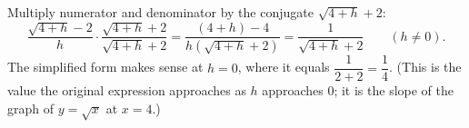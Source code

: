 Multiply numerator and denominator by the conjugate $\sqrt{4+h}+2$:
\[\dfrac{\sqrt{4+h}-2}{h}\cdot\dfrac{\sqrt{4+h}+2}{\sqrt{4+h}+2}=\dfrac{(4+h)-4}{h\left(\sqrt{4+h}+2\right)}=\boxed{\dfrac{1}{\sqrt{4+h}+2}}\qquad(h\ne0).\]
The simplified form makes sense at $h=0$, where it equals $\dfrac{1}{2+2}=\boxed{\dfrac14}$. (This is the value the original expression approaches as $h$ approaches $0$; it is the slope of the graph of $y=\sqrt x$ at $x=4$.)
